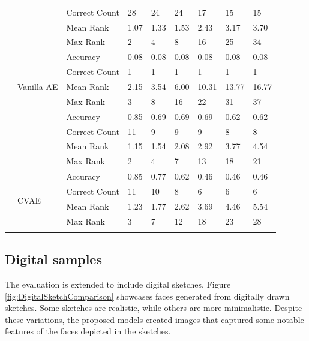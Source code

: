 \documentclass{IEEEcsmag}
\begin{document}
\begin{table}
\begin{tabular*}{\textwidth}{@{}l l l p{30pt}<{\centering} p{30pt}<{\centering} p{30pt}<{\centering} p{30pt}<{\centering} p{30pt}<{\centering} p{30pt}<{\centering}@{}}
&  & Correct Count & 28   & 24   & 24   & 17   & 15   & 15   \\[3pt]
&  & Mean Rank     & 1.07 & 1.33 & 1.53 & 2.43 & 3.17 & 3.70 \\[3pt]
&  & Max Rank      & 2    & 4    & 8    & 16   & 25   & 34   \\[3pt]
\colrule
\multirow{15}{*}{CUHK} 
& \multirow{5}{*}{Vanilla AE} & \rule{0pt}{10pt}Accuracy     & 0.08 & 0.08 & 0.08 & 0.08 & 0.08 & 0.08 \\[3pt]
&  & Correct Count & 1    & 1    & 1    & 1    & 1    & 1    \\[3pt]
&  & Mean Rank     & 2.15 & 3.54 & 6.00 & 10.31 & 13.77 & 16.77 \\[3pt]
&  & Max Rank      & 3    & 8    & 16   & 22   & 31   & 37   \\[3pt]
\cline{2-9}
& \multirow{5}{*}{Proposed AE} & \rule{0pt}{10pt}Accuracy     & 0.85 & 0.69 & 0.69 & 0.69 & 0.62 & 0.62 \\[3pt]
&  & Correct Count & 11   & 9    & 9    & 9    & 8    & 8    \\[3pt]
&  & Mean Rank     & 1.15 & 1.54 & 2.08 & 2.92 & 3.77 & 4.54 \\[3pt]
&  & Max Rank      & 2    & 4    & 7    & 13   & 18   & 21   \\[3pt]
\cline{2-9}
& \multirow{5}{*}{CVAE} & \rule{0pt}{10pt}Accuracy     & 0.85 & 0.77 & 0.62 & 0.46 & 0.46 & 0.46 \\[3pt]
&  & Correct Count & 11   & 10   & 8    & 6    & 6    & 6    \\[3pt]
&  & Mean Rank     & 1.23 & 1.77 & 2.62 & 3.69 & 4.46 & 5.54 \\[3pt]
&  & Max Rank      & 3    & 7    & 12   & 18   & 23   & 28   \\[3pt]
\botrule
\end{tabular*}
\vspace*{8pt}
\end{table}

\subsection{Digital samples}
\label{subsec:digitalSamples}

The evaluation is extended to include digital sketches. Figure \ref{fig:DigitalSketchComparison} showcases faces generated from digitally drawn sketches. Some sketches are realistic, while others are more minimalistic. Despite these variations, the proposed models created images that captured some notable features of the faces depicted in the sketches.
\end{document}
